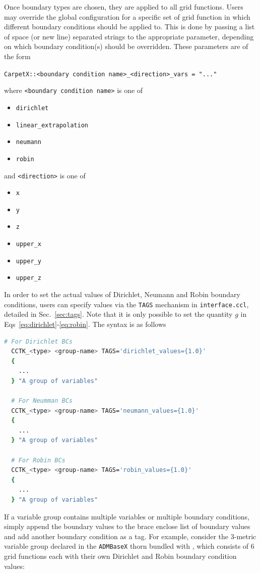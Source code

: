   Once boundary types are chosen, they are applied to all grid functions. Users may override the global configuration for a specific set of grid function in which different boundary conditions should be applied to. This is done by passing a list of space (or new line) separated strings to the appropriate parameter, depending on which boundary condition(s) should be overridden. These parameters are of the form
%
  \begin{center}
    \texttt{CarpetX::<boundary condition name>\_<direction>\_vars = "..."}
  \end{center}
%
where \texttt{<boundary condition name>} is one of
%
\begin{itemize}
  \item \texttt{dirichlet}
  \item \texttt{linear\_extrapolation}
  \item \texttt{neumann}
  \item \texttt{robin}
\end{itemize}
%
and \texttt{<direction>} is one of
\begin{itemize}
  \item \texttt{x}
  \item \texttt{y}
  \item \texttt{z}
  \item \texttt{upper\_x}
  \item \texttt{upper\_y}
  \item \texttt{upper\_z}
\end{itemize}

In order to set the actual values of Dirichlet, Neumann and Robin boundary conditions, users can specify values via the \texttt{TAGS} mechanism in \texttt{interface.ccl}, detailed in Sec.~\ref{sec:tags}. Note that it is only possible to set the quantity $g$ in Eqs~\eqref{eq:dirichlet}-\eqref{eq:robin}. The syntax is as follows

\begin{lstlisting}[language=bash]
  # For Dirichlet BCs
  CCTK_<type> <group-name> TAGS='dirichlet_values={1.0}'
  {
    ...
  } "A group of variables"

  # For Neumman BCs
  CCTK_<type> <group-name> TAGS='neumann_values={1.0}'
  {
    ...
  } "A group of variables"

  # For Robin BCs
  CCTK_<type> <group-name> TAGS='robin_values={1.0}'
  {
    ...
  } "A group of variables"
\end{lstlisting}

If a variable group contains multiple variables or multiple boundary conditions, simply append the boundary values to the brace enclose list of boundary values and add another boundary condition as a tag. For example, consider the 3-metric variable group declared in the \texttt{ADMBaseX} thorn bundled with \CarpetX, which consists of 6 grid functions each with their own Dirichlet and Robin boundary condition values:

